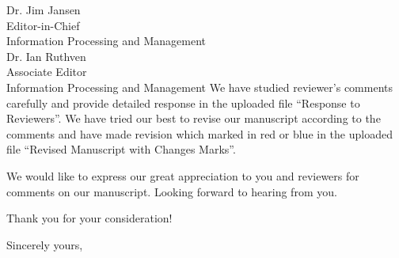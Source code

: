 \documentclass[11pt]{letter} %
\begin{document}
\begin{letter}{Dr. Jim Jansen \\
Editor-in-Chief  \\
Information Processing and Management \\
Dr. Ian Ruthven \\
Associate Editor \\
Information Processing and Management}
We have studied reviewer's comments carefully and provide detailed response in the uploaded file ``Response to Reviewers''. 
We have tried our best to revise our manuscript according to the comments 
and have made revision which marked in red or blue in the uploaded file ``Revised Manuscript with Changes Marks''. 

We would like to express our great appreciation to you and reviewers for comments on our manuscript. 
Looking forward to hearing from you.

Thank you for your consideration!

\closing{Sincerely yours,}




\end{letter}
\end{document}
